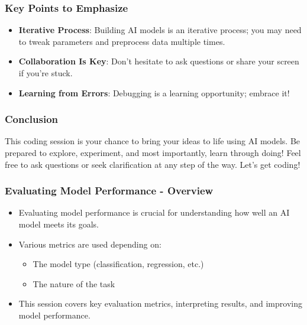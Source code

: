 \documentclass{beamer}
\begin{document}
\begin{frame}
    \frametitle{Key Points to Emphasize}
    \begin{itemize}
        \item \textbf{Iterative Process}: Building AI models is an iterative process; you may need to tweak parameters and preprocess data multiple times.
        \item \textbf{Collaboration Is Key}: Don’t hesitate to ask questions or share your screen if you're stuck.
        \item \textbf{Learning from Errors}: Debugging is a learning opportunity; embrace it!
    \end{itemize}
\end{frame}

\begin{frame}
    \frametitle{Conclusion}
    This coding session is your chance to bring your ideas to life using AI models. Be prepared to explore, experiment, and most importantly, learn through doing! Feel free to ask questions or seek clarification at any step of the way. Let's get coding!
\end{frame}

\begin{frame}[fragile]
    \frametitle{Evaluating Model Performance - Overview}
    \begin{itemize}
        \item Evaluating model performance is crucial for understanding how well an AI model meets its goals.
        \item Various metrics are used depending on: 
        \begin{itemize}
            \item The model type (classification, regression, etc.)
            \item The nature of the task
        \end{itemize}
        \item This session covers key evaluation metrics, interpreting results, and improving model performance.
    \end{itemize}
\end{frame}
\end{document}
